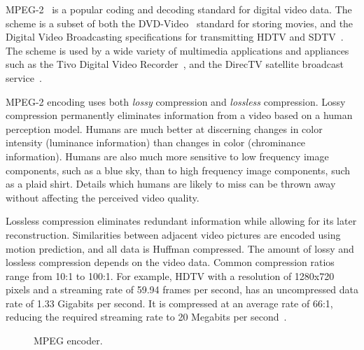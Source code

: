 
MPEG-2~\cite{MPEG2} is a popular coding and decoding standard
for digital video data. The scheme is a subset of both the
DVD-Video~\cite{DVDVideo} standard for storing movies, and the Digital
Video Broadcasting specifications for transmitting HDTV and
SDTV~\cite{DVB}. The scheme is used by a wide variety of multimedia
applications and appliances such as the Tivo Digital Video
Recorder~\cite{tivo}, and the DirecTV satellite broadcast
service~\cite{directv}.

MPEG-2 encoding uses both {\it lossy} compression and {\it lossless}
compression. Lossy compression permanently eliminates information from
a video based on a human perception model. Humans are much better at
discerning changes in color intensity (luminance information) than
changes in color (chrominance information). Humans are also much more
sensitive to low frequency image components, such as a blue sky, than
to high frequency image components, such as a plaid shirt. Details
which humans are likely to miss can be thrown away without affecting
the perceived video quality.

Lossless compression eliminates redundant information while allowing
for its later reconstruction. Similarities between adjacent video
pictures are encoded using motion prediction, and all data is Huffman
compressed\cite{Huffman52}. The amount of lossy and lossless
compression depends on the video data. Common compression ratios range
from 10:1 to 100:1. For example, HDTV with a resolution of 1280x720
pixels and a streaming rate of 59.94 frames per second, has an
uncompressed data rate of 1.33 Gigabits per second. It is compressed at 
an average rate of 66:1, reducing the required streaming rate to
20 Megabits per second~\cite[p. 3]{imagevidstandards}.


\begin{figure}[t]
\begin{center}
\vspace{-12pt}
 \caption{MPEG encoder.}
 \label{fig:mpeg-encoder}
\end{center}
\end{figure}


